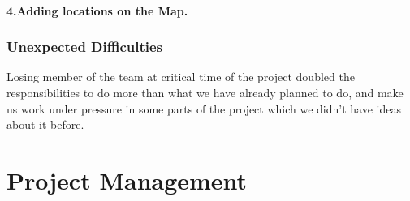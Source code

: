 \documentclass[a4paper, 12pt, english]{book}
\begin{document}
\subsubsection{4.Adding locations on the Map.}
\subsection{Unexpected Difficulties}
Losing member of the team at critical time of the project doubled the responsibilities to do more than what we have already planned to do, and make us work under pressure in some parts of the project which we didn't have ideas about it before.
\chapter{Project Management}
\end{document}
